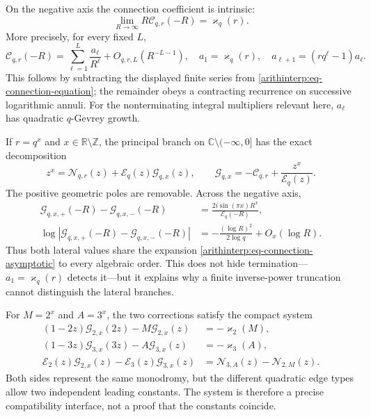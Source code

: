 \documentclass[11pt,oneside]{article}
\theoremstyle{definition}
\theoremstyle{remark}
\newcommand{\Z}{\mathbb Z}
\newcommand{\R}{\mathbb R}
\newcommand{\C}{\mathbb C}
\begin{document}
On the negative axis the connection coefficient is intrinsic:
\begin{equation}
 \lim_{R\to\infty}R\mathcal C_{q,r}(-R)=\varkappa_q(r).
 \label{arithinterp:eq-connection-limit}
\end{equation}
More precisely, for every fixed $L$,
\begin{equation}
 \mathcal C_{q,r}(-R)=\sum_{\ell=1}^{L}\frac{a_\ell}{R^\ell}
 +O_{q,r,L}(R^{-L-1}),
 \quad
 a_1=\varkappa_q(r),\quad
 a_{\ell+1}=(rq^\ell-1)a_\ell.
 \label{arithinterp:eq-connection-asymptotic}
\end{equation}
This follows by subtracting the displayed finite series from
\eqref{arithinterp:eq-connection-equation}; the remainder obeys a contracting recurrence on
successive logarithmic annuli.  For the nonterminating integral multipliers relevant here,
$a_\ell$ has quadratic $q$-Gevrey growth.

If $r=q^x$ and $x\in\R\setminus\Z$, the principal branch on
$\C\setminus(-\infty,0]$ has the exact decomposition
\begin{equation}
 z^x=\mathcal N_{q,r}(z)+\mathcal E_q(z)\mathcal G_{q,x}(z),
 \qquad
 \mathcal G_{q,x}=-\mathcal C_{q,r}+\frac{z^x}{\mathcal E_q(z)}.
 \label{arithinterp:eq-pole-monodromy}
\end{equation}
The positive geometric poles are removable.  Across the negative axis,
\begin{align}
 \mathcal G_{q,x,+}(-R)-\mathcal G_{q,x,-}(-R)
 &=\frac{2i\sin(\pi x)R^x}{\mathcal E_q(-R)},
 \label{arithinterp:eq-pole-monodromy-jump}\\
 \log\left|\mathcal G_{q,x,+}(-R)-\mathcal G_{q,x,-}(-R)\right|
 &=-\frac{(\log R)^2}{2\log q}+O_x(\log R).
 \label{arithinterp:eq-pole-monodromy-jump-size}
\end{align}
Thus both lateral values share the expansion
\eqref{arithinterp:eq-connection-asymptotic} to every algebraic order.  This does not hide
termination---$a_1=\varkappa_q(r)$ detects it---but it explains why a finite inverse-power
truncation cannot distinguish the lateral branches.

For $M=2^x$ and $A=3^x$, the two corrections satisfy the compact system
\begin{align}
 (1-2z)\mathcal G_{2,x}(2z)-M\mathcal G_{2,x}(z)&=-\varkappa_2(M),\\
 (1-3z)\mathcal G_{3,x}(3z)-A\mathcal G_{3,x}(z)&=-\varkappa_3(A),\\
 \mathcal E_2(z)\mathcal G_{2,x}(z)-\mathcal E_3(z)\mathcal G_{3,x}(z)
 &=\mathcal N_{3,A}(z)-\mathcal N_{2,M}(z).
 \label{arithinterp:eq-two-axis-connection}
\end{align}
Both sides represent the same monodromy, but the different quadratic edge types allow two
independent leading constants.  The system is therefore a precise compatibility interface,
not a proof that the constants coincide.
\end{document}

